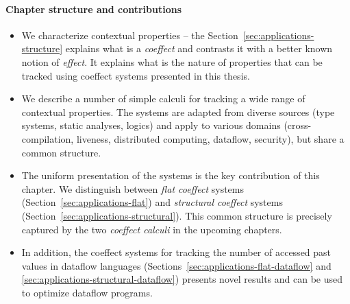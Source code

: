 \paragraph{Chapter structure and contributions}
\begin{itemize}
\item We characterize contextual properties -- the Section~\ref{sec:applications-structure}
  explains what is a \emph{coeffect} and contrasts it with a better known notion of
  \emph{effect}. It explains what is the nature of properties that can be tracked using
  coeffect systems presented in this thesis.

\item We describe a number of simple calculi for tracking a wide range of contextual properties.
  The systems are adapted from diverse sources (type systems, static analyses, logics) and apply to
  various domains (cross-compilation, liveness, distributed computing, dataflow, security), but
  share a common structure.

\item The uniform presentation of the systems is the key contribution of this chapter. We distinguish
  between \emph{flat coeffect} systems (Section~\ref{sec:applications-flat}) and \emph{structural coeffect}
  systems (Section~\ref{sec:applications-structural}). This common structure is precisely
  captured by the two \emph{coeffect calculi} in the upcoming chapters.

\item In addition, the coeffect systems for tracking the number of accessed past values in
  dataflow languages (Sections~\ref{sec:applications-flat-dataflow} and \ref{sec:applications-structural-dataflow})
  presents novel results and can be used to optimize dataflow programs.
\end{itemize}



%
%

